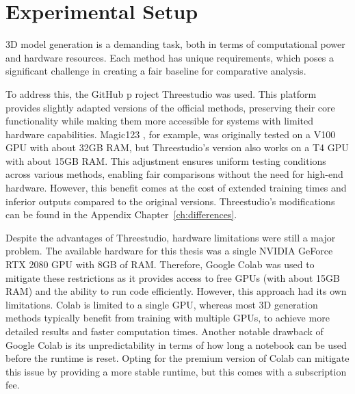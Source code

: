 \section{Experimental Setup}\label{Setup}

3D model generation is a demanding task, both in terms of computational power and hardware resources. Each method has unique requirements, which poses a significant challenge in creating a fair baseline for comparative analysis.

To address this, the GitHub p roject Threestudio \citep{threestudio2023} was used. This platform provides slightly adapted versions of the official methods, preserving their core functionality while making them more accessible for systems with limited hardware capabilities. Magic123 \citep{qian2023magic123}, for example, was originally tested on a V100 GPU with about 32GB RAM, but Threestudio's version also works on a T4 GPU with about 15GB RAM\@. This adjustment ensures uniform testing conditions across various methods, enabling fair comparisons without the need for high-end hardware. However, this benefit comes at the cost of extended training times and inferior outputs compared to the original versions. Threestudio's modifications can be found in the Appendix Chapter~\ref{ch:differences}. 

Despite the advantages of Threestudio, hardware limitations were still a major problem. The available hardware for this thesis was a single NVIDIA GeForce RTX 2080 GPU with 8GB of RAM\@. Therefore, Google Colab \citep{googlecolab} was used to mitigate these restrictions as it provides access to free GPUs (with about 15GB RAM) and the ability to run code efficiently. However, this approach had its own limitations. Colab is limited to a single GPU, whereas most 3D generation methods typically benefit from training with multiple GPUs, to achieve more detailed results and faster computation times. Another notable drawback of Google Colab is its unpredictability in terms of how long a notebook can be used before the runtime is reset. Opting for the premium version of Colab can mitigate this issue by providing a more stable runtime, but this comes with a subscription fee.

